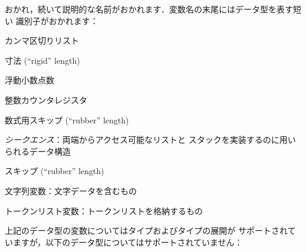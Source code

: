 \documentclass[uplatex,dvipdfmx,full,kernel]{wtpl3doc}
\begin{document}
おかれ，続いて説明的な名前がおかれます．変数名の末尾にはデータ型を表す短い
識別子がおかれます：
%
\begin{description}[style=multiline, leftmargin=5zw]
  \item[\code{clist}] カンマ区切りリスト
  \item[\code{dim}] 寸法 (\enquote{rigid} length) 
  \item[\code{fp}] 浮動小数点数
  \item[\code{int}] 整数カウンタレジスタ
  \item[\code{muskip}] 数式用スキップ (\enquote{rubber} length)
  \item[\code{seq}] \emph{シークエンス}：両端からアクセス可能なリストと
    スタックを実装するのに用いられるデータ構造
  \item[\code{skip}] スキップ (\enquote{rubber} length)
  \item[\code{str}] 文字列変数：文字データを含むもの
  \item[\code{tl}] トークンリスト変数：トークンリストを格納するもの
\end{description}
%
上記のデータ型の変数についてはタイプおよびタイプの展開が
サポートされていますが，以下のデータ型についてはサポートされていません：
%
\end{document}
